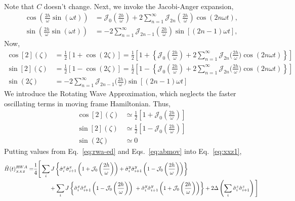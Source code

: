 \documentclass[aps,prb,reprint,showpacs,floatfix,superscriptaddress, onecolumn, nofootinbib, 9pt]{revtex4-2}
\begin{document}
\begin{enumerate}
{\begin{align}
				\label{eq:abmov}
			\end{align}
			Note that $C$ doesn't change.  Next, we invoke the Jacobi-Anger expansion,
			\begin{align*}
				\cos(\frac{2h}{\omega}\sin(\omega t)) &= \mathcal{J}_0\left(\frac{2h}{\omega}\right) + 2 \sum_{n=1}^\infty \mathcal{J}_{2n}\left(\frac{2h}{\omega}\right)\cos(2n\omega t),\\
				\sin(\frac{2h}{\omega}\sin(\omega t)) &=-2 \sum_{n=1}^\infty \mathcal{J}_{2n-1}\left(\frac{2h}{\omega}\right)\sin[(2n-1)\omega t],
			\end{align*}
			Now,
			\begin{align}
				\cos[2](\zeta) &=\frac12\left[1+\cos(2\zeta)\right]=\frac12\left[1+\left\{\mathcal{J}_0\left(\frac{2h}{\omega}\right) + 2 \sum_{n=1}^\infty \mathcal{J}_{2n}\Big(\frac{2h}{\omega}\Big)\cos(2n\omega t)\right\}\right]\\
				\sin[2](\zeta) &=\frac12\left[1-\cos(2\zeta)\right]=\frac12\left[1-\left\{\mathcal{J}_0\left(\frac{2h}{\omega}\right) + 2 \sum_{n=1}^\infty \mathcal{J}_{2n}\Big(\frac{2h}{\omega}\Big)\cos(2n\omega t)\right\}\right]\\
				\sin(2\zeta) &= -2 \sum_{n=1}^\infty \mathcal{J}_{2n-1}\Big(\frac{2h}{\omega}\Big)\sin[(2n-1)\omega t]
			\end{align}
			We introduce the Rotating Wave Approximation, which neglects the faster oscillating terms in moving frame Hamiltonian. Thus,
			\begin{align}
				\cos[2](\zeta) &\simeq\frac12\left[1+\mathcal{J}_0\left(\frac{2h}{\omega}\right)\right]\nonumber\\
				\sin[2](\zeta) &\simeq\frac12\left[1-\mathcal{J}_0\left(\frac{2h}{\omega}\right)\right]\nonumber\\
				\sin(2\zeta) &\simeq 0	
				\label{eq:rwa-ed}
			\end{align}
			Putting values from Eq.~\eqref{eq:rwa-ed} and Eqs.~\eqref{eq:abmov} into Eq.~\eqref{eq:xxz1},
			\begin{align}
				\tilde{H}(t)^{RWA}_{_{XXZ}}= & \frac14\Bigg[\sum_i J\left\{ \hat{\sigma}^x_i \hat{\sigma}^x_{i+1}\left(1+ \mathcal{J}_0\left(\frac{2h}{\omega}\right)\right) + \hat{\sigma}^y_i \hat{\sigma}^y_{i+1} \left(1- \mathcal{J}_0\left(\frac{2h}{\omega}\right)\right)\right\}\nonumber\\
				& \hskip1cm + \sum_i J\left\{ \hat{\sigma}^x_i \hat{\sigma}^x_{i+1}\left(1- \mathcal{J}_0\left(\frac{2h}{\omega}\right)\right)\ + \hat{\sigma}^y_i \hat{\sigma}^y_{i+1} \left(1+ \mathcal{J}_0\left(\frac{2h}{\omega}\right)\right)\right\} + 2\Delta \left(\sum_{i}  \hat{\sigma}_{i}^{z} \hat{\sigma}_{i+1}^{z}\right)\Bigg]\nonumber\\

\end{align}}
\end{enumerate}
\end{document}
